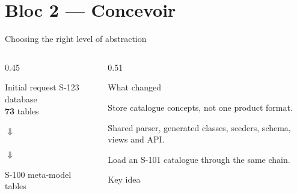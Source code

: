 \section{Bloc 2 — Concevoir}


\begin{frame}{Choosing the right level of abstraction}
\begin{columns}[T]
\begin{column}{0.45\linewidth}
\begin{block}{Initial request}
\centering\Large S-123 database\\[0.2em]
{\color{Red}\fontsize{30}{32}\selectfont\bfseries 73} \small tables
\end{block}
\vspace{0.3em}
\begin{center}{\Large$\Downarrow$}\\[-0.1em]\small{}\\[-0.1em]{\Large$\Downarrow$}\end{center}
\begin{block}{S-100 meta-model}
 \small tables
\end{block}
\end{column}
\begin{column}{0.51\linewidth}
\begin{block}{What changed}
\small
\begin{tightitems}
  \item Store catalogue concepts, not one product format.
  \item Shared parser, generated classes, seeders, schema, views and API.
  \item Load an S-101 catalogue through the same chain.
\end{tightitems}
\end{block}
\vspace{0.4em}
\begin{block}{Key idea}
\centering{}
\end{block}
\end{column}
\end{columns}
\end{frame}

